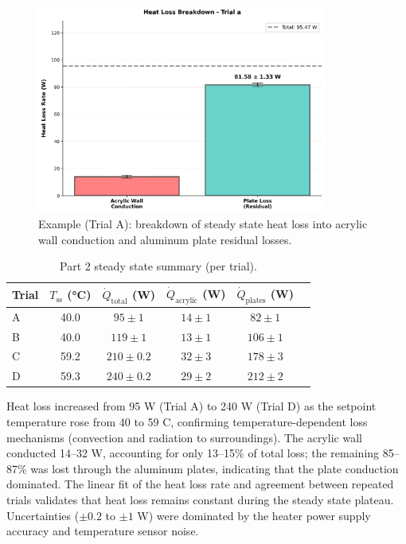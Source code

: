 \documentclass[12pt]{article}
\begin{document}
\begin{figure}[H]
\centering
\includegraphics[width=0.85\textwidth]{graphs/part2_trial_a_loss_breakdown.png}
\caption{Example (Trial A): breakdown of steady state heat loss into acrylic wall conduction and aluminum plate residual losses.}
\label{fig:part2_breakdown}
\end{figure}

\begin{table}[H]\centering
\begin{tabular}{@{}lccccc@{}}
\toprule
Trial & $T_{\text{ss}}$ (\si{\celsius}) & $\dot Q_{\text{total}}$ (W) & $\dot Q_{\text{acrylic}}$ (W) & $\dot Q_{\text{plates}}$ (W) \\
\midrule
A & 40.0 & $95 \pm 1$ & $14 \pm 1$ & $82 \pm 1$ \\
B & 40.0 & $119 \pm 1$ & $13 \pm 1$ & $106 \pm 1$ \\
C & 59.2 & $210 \pm 0.2$ & $32 \pm 3$ & $178 \pm 3$ \\
D & 59.3 & $240 \pm 0.2$ & $29 \pm 2$ & $212 \pm 2$ \\
\bottomrule
\end{tabular}
\caption{Part 2 steady state summary (per trial).}
\label{tab:part2}
\end{table}

Heat loss increased from 95 W (Trial A) to 240 W (Trial D) as the setpoint temperature rose from 40 to 59 \textdegree C, confirming temperature-dependent loss mechanisms (convection and radiation to surroundings). The acrylic wall conducted 14–32 W, accounting for only 13–15\% of total loss; the remaining 85–87\% was lost through the aluminum plates, indicating that the plate conduction dominated. The linear fit of the heat loss rate and agreement between repeated trials validates that heat loss remains constant during the steady state plateau. Uncertainties ($\pm 0.2$ to $\pm 1$ W) were dominated by the heater power supply accuracy and temperature sensor noise.
\end{document}
